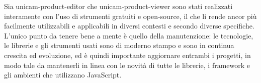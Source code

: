 Sia unicam-product-editor che unicam-product-viewer sono stati realizzati interamente con l'uso di strumenti gratuiti e open-source, il che li rende ancor più facilmente utilizzabili e applicabili in diversi contesti e secondo diverse specifiche.
L'unico punto da tenere bene a mente è quello della manutenzione: le tecnologie, le librerie e gli strumenti usati sono di moderno stampo e sono in continua crescita ed evoluzione, ed è quindi importante aggiornare entrambi i progetti, in modo tale da mantenerli in linea con le novità di tutte le librerie, i framework e gli ambienti che utilizzano JavaScript.
